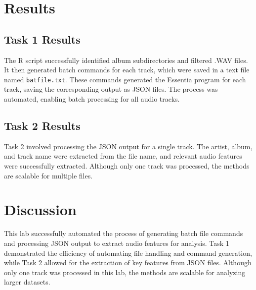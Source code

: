 \documentclass{article}\usepackage[]{graphicx}\usepackage[]{xcolor}
\begin{document}
\begin{multicols}{2}
\pagebreak

\section{Results}

\subsection{Task 1 Results}
The R script successfully identified album subdirectories and filtered .WAV files. It then generated batch commands for each track, which were saved in a text file named \texttt{batfile.txt}. These commands generated the Essentia program for each track, saving the corresponding output as JSON files. The process was automated, enabling batch processing for all audio tracks.

\subsection{Task 2 Results}
Task 2 involved processing the JSON output for a single track. The artist, album, and track name were extracted from the file name, and relevant audio features were successfully extracted. Although only one track was processed, the methods are scalable for multiple files.

\section{Discussion}
This lab successfully automated the process of generating batch file commands and processing JSON output to extract audio features for analysis. Task 1 demonstrated the efficiency of automating file handling and command generation, while Task 2 allowed for the extraction of key features from JSON files. Although only one track was processed in this lab, the methods are scalable for analyzing larger datasets. 
\columnbreak

\vspace{2em}

\begin{tiny}

\end{tiny}
\end{multicols}

\newpage
\onecolumn
\end{document}
